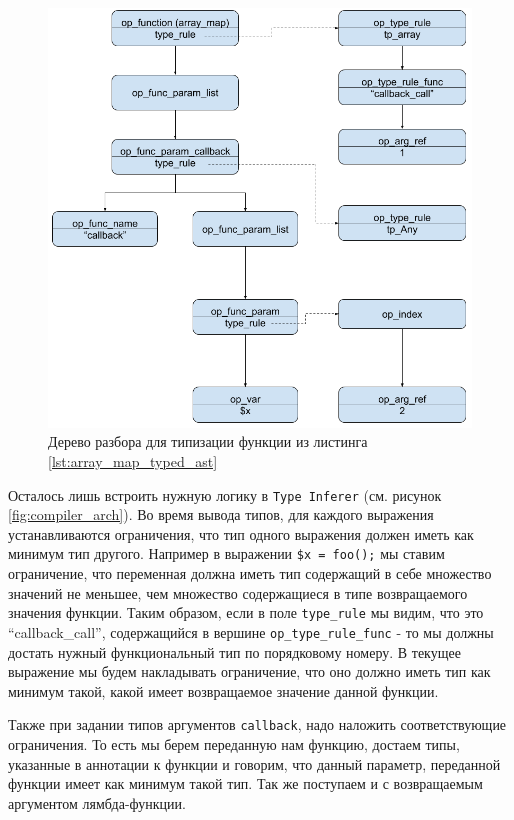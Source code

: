 \begin{figure}[H]
    \caption{Дерево разбора для типизации функции из листинга \ref{lst:array_map_typed_ast}}
    \label{fig:ast_for_callback}
    \centering
    \includegraphics[width=\linewidth]{images/ast_for_callback}
\end{figure}

Осталось лишь встроить нужную логику в \verb|Type Inferer| (см. рисунок \ref{fig:compiler_arch}).
Во время вывода типов, для каждого выражения устанавливаются ограничения, что тип одного выражения должен иметь как минимум тип другого.
Например в выражении \verb|$x = foo();| мы ставим ограничение, что переменная должна иметь тип содержащий в себе множество значений не меньшее, чем множество содержащиеся в типе возвращаемого значения функции.
Таким образом, если в поле \verb|type_rule| мы видим, что это ``callback\_call'', содержащийся в вершине \verb|op_type_rule_func| - то мы должны достать нужный функциональный тип по порядковому номеру.
В текущее выражение мы будем накладывать ограничение, что оно должно иметь тип как минимум такой, какой имеет возвращаемое значение данной функции.

Также при задании типов аргументов \verb|callback|, надо наложить соответствующие ограничения.
То есть мы берем переданную нам функцию, достаем типы, указанные в аннотации к функции и говорим, что данный параметр, переданной функции имеет как минимум такой тип.
Так же поступаем и с возвращаемым аргументом лямбда-функции.

